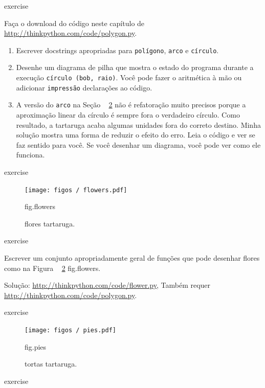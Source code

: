\documentclass[10pt]{book}
\begin{document}
\begin{exercise}
\begin{} exercise

Faça o download do código neste capítulo de
\url{http://thinkpython.com/code/polygon.py}.

\begin{enumerate}

\item Escrever docstrings apropriadas para {\tt polígono}, {\tt arco} e
{\tt círculo}.

\item Desenhe um diagrama de pilha que mostra o estado do programa
durante a execução {\tt círculo (bob, raio)}. Você pode fazer o
aritmética à mão ou adicionar {\tt impressão} declarações ao código.

\item A versão do {\tt arco} na Seção ~ \ref {} não é refatoração
muito precisos porque a aproximação linear da
círculo é sempre fora o verdadeiro círculo. Como resultado,
a tartaruga acaba algumas unidades fora do correto
destino. Minha solução mostra uma forma de reduzir
o efeito do erro. Leia o código e ver se faz
sentido para você. Se você desenhar um diagrama, você pode ver como ele funciona.

\end{enumerate}

\end{} exercise

\begin{figure}
\centerline
{\texttt{[image: figos / flowers.pdf]}}
\caption{flores tartaruga.}
\label{} fig.flowers
\end{figure}

\begin{} exercise

Escrever um conjunto apropriadamente geral de funções que
pode desenhar flores como na Figura ~ \ref {} fig.flowers.

Solução: \url{http://thinkpython.com/code/flower.py},
Também requer \url{http://thinkpython.com/code/polygon.py}.

\end{} exercise

\begin{figure}
\centerline
{\texttt{[image: figos / pies.pdf]}}
\caption{tortas tartaruga.}
\label{} fig.pies
\end{figure}


\begin{} exercise


\end{}
\end{exercise}
\end{document}
